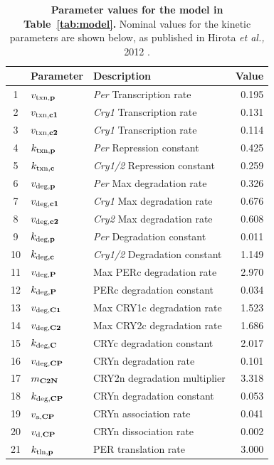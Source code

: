 \documentclass[11pt, letterpaper]{article}
\begin{document}
\begin{table}[p]
  \caption{{\bfseries Parameter values for the model in Table~\ref{tab:model}.} Nominal values for the kinetic parameters are shown below, as published in Hirota {\itshape et al.,} 2012 \cite{Hirota2012}.}
  \label{tab:parset}
  \vspace{2mm}
  \centering
  \begin{tabular}{cllr} \toprule
       & Parameter                 & Description                       & Value \\ \midrule
    1  & $v_{\text{txn,{\bf p}}}$  & {\it Per} Transcription rate      & 0.195 \\
    2  & $v_{\text{txn,{\bf c1}}}$ & {\it Cry1} Transcription rate     & 0.131 \\
    3  & $v_{\text{txn,{\bf c2}}}$ & {\it Cry1} Transcription rate     & 0.114 \\
    4  & $k_{\text{txn,{\bf p}}}$  & {\it Per} Repression constant     & 0.425 \\
    5  & $k_{\text{txn,{\bf c}}}$  & {\it Cry1/2} Repression constant  & 0.259 \\
    6  & $v_{\text{deg,{\bf p}}}$  & {\it Per} Max degradation rate    & 0.326 \\
    7  & $v_{\text{deg,{\bf c1}}}$ & {\it Cry1} Max degradation rate   & 0.676 \\
    8  & $v_{\text{deg,{\bf c2}}}$ & {\it Cry2} Max degradation rate   & 0.608 \\
    9  & $k_{\text{deg,{\bf p}}}$  & {\it Per} Degradation constant    & 0.011 \\
    10 & $k_{\text{deg,{\bf c}}}$  & {\it Cry1/2} Degradation constant & 1.149 \\
    11 & $v_{\text{deg,{\bf P}}}$  & Max PERc degradation rate         & 2.970 \\
    12 & $k_{\text{deg,{\bf P}}}$  & PERc degradation constant         & 0.034 \\
    13 & $v_{\text{deg,{\bf C1}}}$ & Max CRY1c degradation rate        & 1.523 \\
    14 & $v_{\text{deg,{\bf C2}}}$ & Max CRY2c degradation rate        & 1.686 \\
    15 & $k_{\text{deg,{\bf C}}}$  & CRYc degradation constant         & 2.017 \\
    16 & $v_{\text{deg,{\bf CP}}}$ & CRYn degradation rate             & 0.101 \\
    17 & $m_{\text{\bf C2N}}$      & CRY2n degradation multiplier      & 3.318 \\
    18 & $k_{\text{deg,{\bf CP}}}$ & CRYn degradation constant         & 0.053 \\
    19 & $v_{\text{a,{\bf CP}}}$   & CRYn association rate             & 0.041 \\
    20 & $v_{\text{d,{\bf CP}}}$   & CRYn dissociation rate            & 0.002 \\
    21 & $k_{\text{tln,{\bf p}}}$  & PER translation rate              & 3.000 \\ \bottomrule
    \hline
  \end{tabular}
\end{table}
\end{document}

